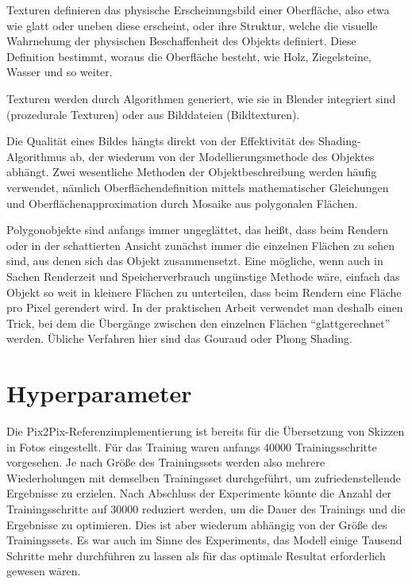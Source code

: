 Texturen definieren das physische Erscheinungsbild einer Oberfläche, also etwa wie glatt oder uneben diese erscheint, oder ihre Struktur, welche die visuelle Wahrnehumg der physischen Beschaffenheit des Objekts definiert. Diese Definition bestimmt, woraus die Oberfläche besteht, wie Holz, Ziegelsteine, Wasser und so weiter. \cite{blain2020blender}

Texturen werden durch Algorithmen generiert, wie sie in Blender integriert sind (prozedurale Texturen) oder aus Bilddateien (Bildtexturen). \cite{blain2020blender}

Die Qualität eines Bildes hängts direkt von der Effektivität des Shading-Algorithmus ab, der wiederum von der Modellierungsmethode des Objektes abhängt. Zwei wesentliche Methoden der Objektbeschreibung werden häufig verwendet, nämlich Oberflächendefinition mittels mathematischer Gleichungen und Oberflächenapproximation durch Mosaike aus polygonalen Flächen. \cite{phong1975shading}

Polygonobjekte sind anfangs immer ungeglättet, das heißt, dass beim Rendern oder in der schattierten Ansicht zunächst immer die einzelnen Flächen zu sehen sind, aus denen sich das Objekt zusammensetzt. Eine mögliche, wenn auch in Sachen Renderzeit und Speicherverbrauch ungünstige Methode wäre, einfach das Objekt so weit in kleinere Flächen zu unterteilen, dass beim Rendern eine Fläche pro Pixel gerendert wird. In der praktischen Arbeit verwendet man deshalb einen Trick, bei dem die Übergänge zwischen den einzelnen Flächen ``glattgerechnet'' werden. Übliche Verfahren hier sind das Gouraud oder Phong Shading. \cite{wartmann2014blender}

\section{Hyperparameter}
\label{sec:hyperparams}
Die Pix2Pix-Referenzimplementierung ist bereits für die Übersetzung von Skizzen in Fotos eingestellt. Für das Training waren anfangs $40000$ Trainingsschritte vorgesehen. Je nach Größe des Trainingssets werden also mehrere Wiederholungen mit demselben Trainingsset durchgeführt, um zufriedenstellende Ergebnisse zu erzielen. Nach Abschluss der Experimente könnte die Anzahl der Trainingsschritte auf $30000$ reduziert werden, um die Dauer des Trainings und die Ergebnisse zu optimieren. Dies ist aber wiederum abhängig von der Größe des Trainingssets. Es war auch im Sinne des Experiments, das Modell einige Tausend Schritte mehr durchführen zu lassen als für das optimale Resultat erforderlich gewesen wären.


